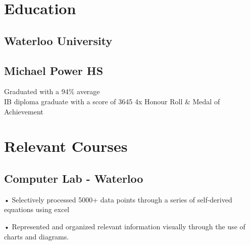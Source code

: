 \documentclass[letterpaper]{deedy-resume} %
\begin{document}
\vspace{-10pt}
\begin{minipage}[t]{0.33\textwidth} %


\section{Education} 

\subsection{Waterloo University}


\sectionspace %



\sectionspace %

\subsection{Michael Power HS}
 	Graduated with a 94\% average \\
IB diploma graduate with a score of 36\/45
4x Honour Roll \& Medal of Achievement 
\sectionspace
\section{Relevant Courses}

\subsection{Computer Lab - Waterloo}
•	Selectively processed 5000+ data points through a series of self-derived  equations using excel


•	Represented and organized relevant information visually through the use of charts and diagrams. 
\sectionspace


\end{minipage}
\end{document}
